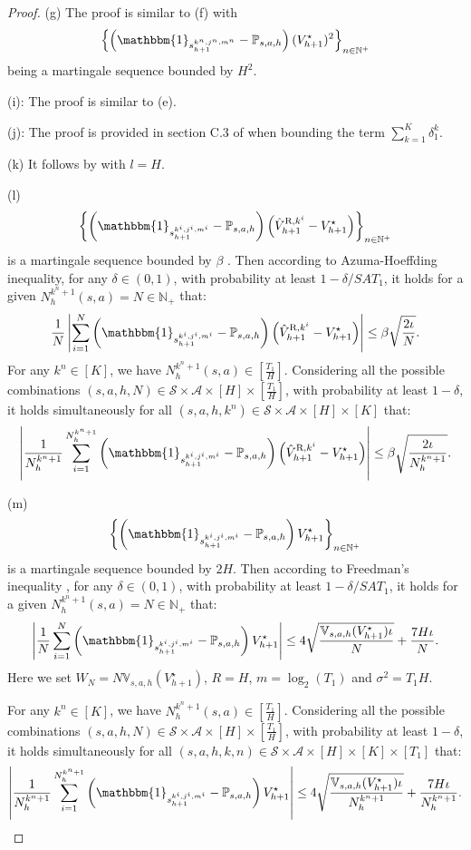 \documentclass{article}
\newcommand{\R}{\textnormal{R}}
\begin{document}
\begin{proof}
    (g) The proof is similar to (f) with $$\left\{\left(\mathbbm{1}_{s_{h+1}^{k^n,j^n,m^n}}-\mathbb{P}_{s,a,h}\right)(V_{h+1}^{\star})^2\right\}_{n\in \mathbb{N}^+}$$
    being a martingale sequence bounded by $H^2$.

    (i): The proof is similar to (e).

    (j): The proof is provided in section C.3 of \cite{zheng2023federated} when bounding the term $\sum_{k=1}^K \delta_1^k$.

    (k) It follows by  with $l = H$.

    (l)
    $$\left\{\left(\mathbbm{1}_{s_{h+1}^{k^i,j^i,m^i}}-\mathbb{P}_{s,a,h}\right)\left(\hat{V}_{h+1}^{\R,k^i}-V_{h+1}^{\star}\right)\right\}_{n\in \mathbb{N}^+}$$
    is a martingale sequence bounded by $\beta$ . Then according to Azuma-Hoeffding inequality, for any $\delta \in (0,1)$, with probability at least $1-\delta/SAT_1$, it holds for a given $N_h^{k^n+1}(s,a) = N \in \mathbb{N}_{+}$ that:
    $$\frac{1}{N}\left|\sum_{i=1}^{N}\left(\mathbbm{1}_{s_{h+1}^{k^i,j^i,m^i}}-\mathbb{P}_{s,a,h}\right)\left(\hat{V}_{h+1}^{\R,k^i}-V_{h+1}^{\star}\right)\right|\leq \beta\sqrt{\frac{2\iota}{N}}.$$
    For any $k^n \in [K]$, we have $N_h^{k^n+1}(s,a) \in [\frac{T_1}{H}]$. Considering all the possible combinations $(s,a,h,N) \in \mathcal{S} \times \mathcal{A} \times [H] \times [\frac{T_1}{H}]$, with probability at least $1-\delta$, it holds simultaneously for all $(s,a,h,k^n) \in \mathcal{S} \times \mathcal{A} \times [H] \times [K]$ that:
    $$\left|\frac{1}{N_h^{k^n+1}} \sum_{i=1}^{N_h^{k^n+1}}\left(\mathbbm{1}_{s_{h+1}^{k^i,j^i,m^i}}-\mathbb{P}_{s,a,h}\right)\left(\hat{V}_{h+1}^{\R,k^i}-V_{h+1}^{\star}\right)\right| \leq \beta\sqrt{\frac{2\iota}{N_h^{k^n+1}}}.$$

    (m)
    $$\left\{\left(\mathbbm{1}_{s_{h+1}^{k^i,j^i,m^i}}-\mathbb{P}_{s,a,h}\right)V_{h+1}^{\star}\right\}_{n\in \mathbb{N}^+}$$
    is a martingale sequence bounded by $2H$. Then according to Freedman's inequality , for any $\delta\in(0,1)$, with probability at least $1-\delta/SAT_1$, it holds for a given $N_h^{k^n+1}(s,a) = N \in \mathbb{N}_{+}$ that:
    $$\left|\frac{1}{N} \sum_{i=1}^{N}\left(\mathbbm{1}_{s_{h+1}^{k^i,j^i,m^i}}-\mathbb{P}_{s,a,h}\right)V_{h+1}^{\star}\right| \leq 4\sqrt{\frac{\mathbb{V}_{s,a,h}(V_{h+1}^{\star})\iota}{N}}+\frac{7H\iota}{N}.$$
    Here we set $W_N = N\mathbb{V}_{s,a,h}(V_{h+1}^{\star})$, $R= H$, $m = \log_2(T_1)$ and $\sigma^2 = T_1H$.
    
    For any $k^n \in [K]$, we have $N_h^{k^n+1}(s,a) \in [\frac{T_1}{H}]$. Considering all the possible combinations $(s,a,h,N) \in \mathcal{S} \times \mathcal{A} \times [H] \times [\frac{T_1}{H}]$, with probability at least $1-\delta$, it holds simultaneously for all $(s,a,h,k,n) \in \mathcal{S} \times \mathcal{A} \times [H] \times [K] \times [T_1]$ that:
    $$\left|\frac{1}{N_h^{k^n+1}} \sum_{i=1}^{N_h^{k^n+1}}\left(\mathbbm{1}_{s_{h+1}^{k^i,j^i,m^i}}-\mathbb{P}_{s,a,h}\right)V_{h+1}^{\star}\right| \leq 4\sqrt{\frac{\mathbb{V}_{s,a,h}(V_{h+1}^{\star})\iota}{N_h^{k^n+1}}}+\frac{7H\iota}{N_h^{k^n+1}}.$$


\end{proof}
\end{document}
